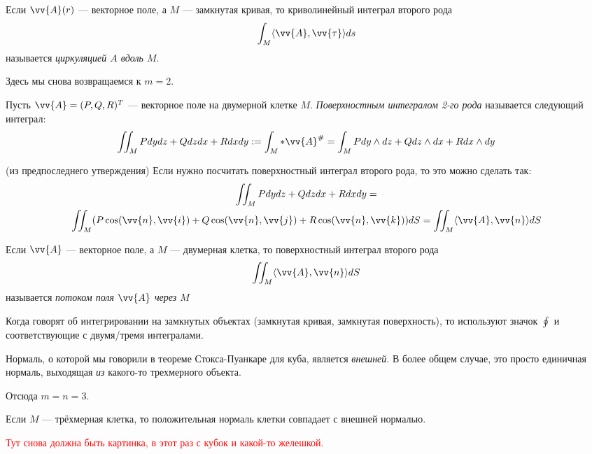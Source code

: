 \begin{definition}
	Если $\vv{A}(r)$ --- векторное поле, а $M$ --- замкнутая кривая, то криволинейный интеграл второго рода
	\[
		\int_M \ntbr{\vv{A}, \vv{\tau}}ds
	\]
	называется \textit{циркуляцией $A$ вдоль $M$}.
\end{definition}

\begin{note}
	Здесь мы снова возвращаемся к $m = 2$.
\end{note}

\begin{definition}
	Пусть $\vv{A} = (P, Q, R)^T$ --- векторное поле на двумерной клетке $M$. \textit{Поверхностным интегралом 2-го рода} называется следующий интеграл:
	\[
	\iint_M Pdydz + Qdzdx + Rdxdy := \int_M *\vv{A}^\# = \int_M Pdy \wedge dz + Q dz \wedge dx + Rdx \wedge dy
	\]
\end{definition}

\begin{corollary} (из предпоследнего утверждения)
	Если нужно посчитать поверхностный интеграл второго рода, то это можно сделать так:
	\begin{multline*}
	\iint_M Pdydz + Qdzdx + Rdxdy =
	\\
	\iint_M (P\cos(\vv{n}, \vv{i}) + Q\cos(\vv{n}, \vv{j}) + R\cos(\vv{n}, \vv{k}))dS = \iint_M \ntbr{\vv{A}, \vv{n}}dS
	\end{multline*}
\end{corollary}

\begin{definition}
	Если $\vv{A}$ --- векторное поле, а $M$ --- двумерная клетка, то поверхностный интеграл второго рода
	\[
	\iint_M \ntbr{\vv{A}, \vv{n}}dS
	\]
	называется \textit{потоком поля $\vv{A}$ через $M$}
\end{definition}

\begin{anote}
	Когда говорят об интегрировании на замкнутых объектах (замкнутая кривая, замкнутая поверхность), то используют значок $\oint$ и соответствующие с двумя/тремя интегралами.
\end{anote}

\begin{reminder}
	Нормаль, о которой мы говорили в теореме Стокса-Пуанкаре для куба, является \textit{внешней}. В более общем случае, это просто единичная нормаль, выходящая \textit{из} какого-то трехмерного объекта.
\end{reminder}

\begin{note}
	Отсюда $m = n = 3$.
\end{note}

\begin{lemma}
	Если $M$ --- трёхмерная клетка, то положительная нормаль клетки совпадает с внешней нормалью.
\end{lemma}

\textcolor{red}{Тут снова должна быть картинка, в этот раз с кубок и какой-то желешкой.}
